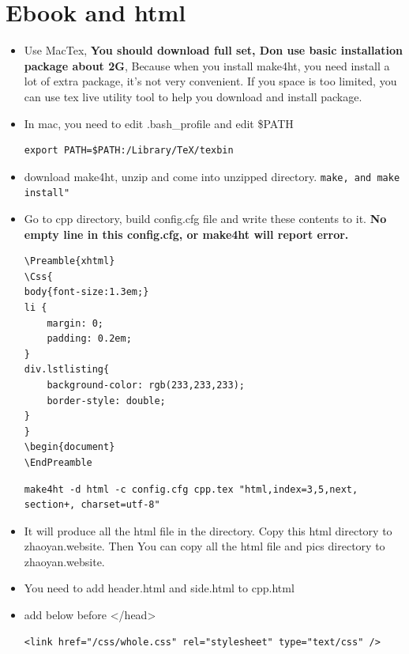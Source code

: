 \documentclass[a4paper,12pt,twoside]{book}
\begin{document}
\section{Ebook and html}
\begin{itemize}

\item Use MacTex, \textbf{You should download full set, Don use basic installation package about 2G}, Because when you install make4ht, you need install a lot of extra package, it's not very convenient. If you space is too limited, you can use tex live utility tool to help you download and install package. 

\item In mac, you need to edit .bash\_profile and edit \$PATH
\begin{verbatim}
export PATH=$PATH:/Library/TeX/texbin
\end{verbatim}

\item download make4ht, unzip and come into unzipped directory. 
\verb=make, and make install"=

\item Go to cpp directory, build config.cfg file and write these contents to it. \textbf{No empty line in this config.cfg, or make4ht will report error.}
\begin{verbatim}
\Preamble{xhtml}
\Css{
body{font-size:1.3em;}
li {
    margin: 0;
    padding: 0.2em;
}
div.lstlisting{
    background-color: rgb(233,233,233); 
    border-style: double;
}
}
\begin{document}
\EndPreamble

\end{verbatim}

\begin{verbatim}
make4ht -d html -c config.cfg cpp.tex "html,index=3,5,next, section+, charset=utf-8" 
\end{verbatim}

\item It will produce all the html file in the directory. Copy this html directory to zhaoyan.website.  Then You can copy all the html file and pics directory to zhaoyan.website. 

\item You need to add header.html and side.html to cpp.html

\item  add below before </head>
\begin{verbatim}
<link href="/css/whole.css" rel="stylesheet" type="text/css" />    
    

\end{verbatim}
\end{itemize}
\end{document}
